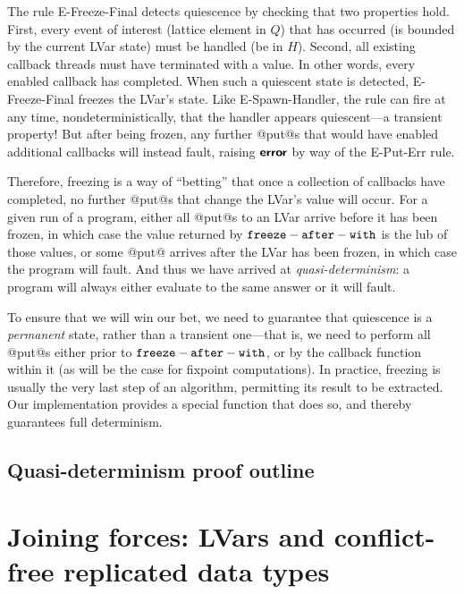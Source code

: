 \documentclass{article}
\begin{document}
The rule {\sc E-Freeze-Final} detects quiescence by checking that two
properties hold.  First, every event of interest (lattice element in
$Q$) that has occurred (is bounded by the current LVar state) must be
handled (be in $H$).  Second, all existing callback threads must have
terminated with a value.  In other words, every enabled callback has
completed.  When such a quiescent state is detected, {\sc
  E-Freeze-Final} freezes the LVar's state.  Like {\sc
  E-Spawn-Handler}, the rule can fire at any time,
nondeterministically, that the handler appears quiescent---a transient
property!  But after being frozen, any further @put@s that would have
enabled additional callbacks will instead fault, raising $\textbf{\textsf{error}}$ by
way of the {\sc E-Put-Err} rule.  

Therefore, freezing is a way of ``betting'' that once a collection of callbacks
have completed, no further @put@s that change the LVar's value will occur.  For
a given run of a program, either all @put@s to an LVar arrive before it has
been frozen, in which case the value returned by ${\mbox{\texttt{freeze}}-\mbox{\texttt{after}}-\mbox{\texttt{with}}}$ is the lub of those
values, or some @put@ arrives after the LVar has been frozen, in which case the
program will fault.  And thus we have arrived at \emph{quasi-determinism}: a
program will always either evaluate to the same answer or it will fault.

To ensure that we will win our bet, we need to guarantee that quiescence is a
\emph{permanent} state, rather than a transient one---that is, we need to
perform all @put@s either prior to ${\mbox{\texttt{freeze}}-\mbox{\texttt{after}}-\mbox{\texttt{with}}}$, or by the callback function within it
(as will be the case for fixpoint computations).  In practice, freezing is
usually the very last step of an algorithm, permitting its result to be
extracted. Our implementation provides a special 
function that does so, and thereby guarantees full determinism.

\subsection{Quasi-determinism proof outline}


\section{Joining forces: LVars and conflict-free replicated data types}\label{s:crdts}
\end{document}
